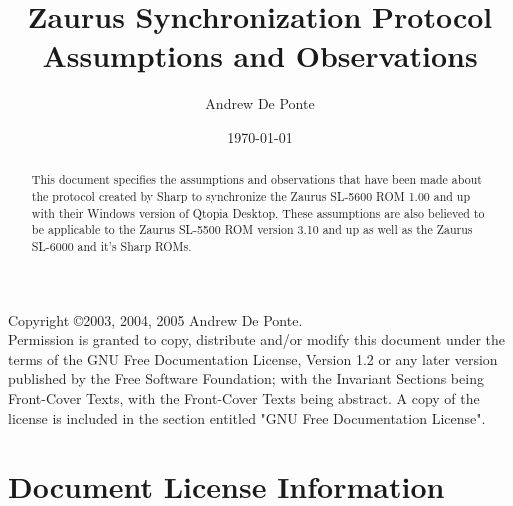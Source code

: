 \documentclass{report}
\title{Zaurus Synchronization Protocol Assumptions and Observations}
\author{Andrew De Ponte}
\date{\today}
\begin{document}
\maketitle

\begin{abstract}
This document specifies the assumptions and observations that have been made
about the protocol created by Sharp to synchronize the Zaurus SL-5600 ROM 1.00
and up with their Windows version of Qtopia Desktop. These assumptions are
also believed to be applicable to the Zaurus SL-5500 ROM version 3.10 and up
as well as the Zaurus SL-6000 and it's Sharp ROMs.
\end{abstract}

\newpage

\noindent Copyright \copyright 2003, 2004, 2005 Andrew De Ponte.\\
Permission is granted to copy, distribute and/or modify this document
under the terms of the GNU Free Documentation License, Version 1.2
or any later version published by the Free Software Foundation;
with the Invariant Sections being Front-Cover Texts, with the
Front-Cover Texts being abstract. A copy of the license is included
in the section entitled "GNU Free Documentation License".

\newpage

\tableofcontents

\newpage





\part{Document License Information}


\end{document}
